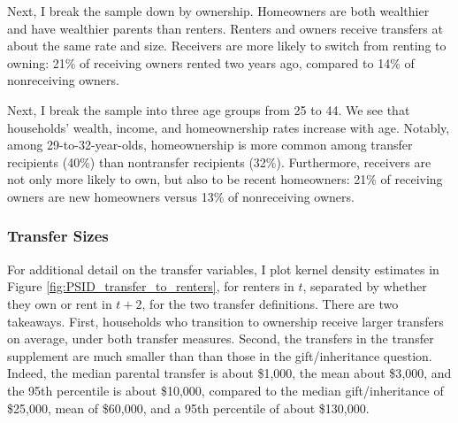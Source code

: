 \documentclass[12pt]{article}
\begin{document}
Next, I break the sample down by ownership. Homeowners are both wealthier and have wealthier parents than renters. Renters and owners receive transfers at about the same rate and size. Receivers are more likely to switch from renting to owning: 21\% of receiving owners rented two years ago, compared to 14\% of nonreceiving owners.

Next, I break the sample into three age groups from 25 to 44. We see that households' wealth, income, and homeownership rates increase with age. Notably, among 29-to-32-year-olds, homeownership is more common among transfer recipients (40\%) than nontransfer recipients (32\%). Furthermore, receivers are not only more likely to own, but also to be recent homeowners: 21\% of receiving owners are new homeowners versus 13\% of nonreceiving owners. 

\subsubsection{Transfer Sizes}
For additional detail on the transfer variables, I plot kernel density estimates in Figure \ref{fig:PSID_transfer_to_renters}, for renters in $t$, separated by whether they own or rent in $t+2$, for the two transfer definitions. There are two takeaways. First, households who transition to ownership receive larger transfers on average, under both transfer measures. Second, the transfers in the transfer supplement are much smaller than than those in the gift/inheritance question. Indeed, the median parental transfer is about \$1{,}000, the mean about \$3{,}000, and the 95th percentile is about \$10{,}000, compared to the median gift/inheritance of \$25{,}000, mean of \$60{,}000, and a 95th percentile of about \$130{,}000.
\end{document}
